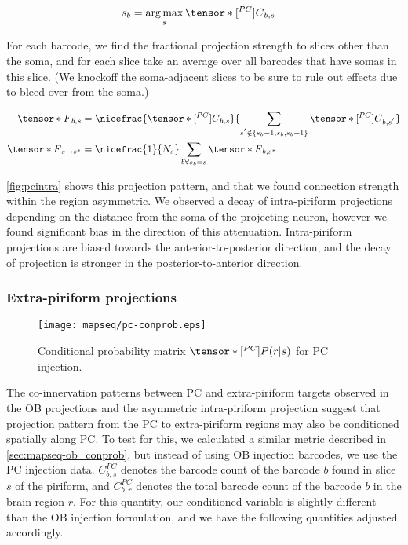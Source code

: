 \documentclass[../dissertation.tex]{subfiles}
\begin{document}
\begin{align}
    s_b & = \operatorname*{arg\,max}_s \tensor*[^{PC}]{C}{_{b, s}}
\end{align}

For each barcode, we find the fractional projection strength to slices other than the soma, and for each slice take an average over all barcodes that have somas in this slice. 
(We knockoff the soma-adjacent slices to be sure to rule out effects due to bleed-over from the soma.)

\begin{align}
    \tensor*{F}{_{b, s}} & = \nicefrac{
        \tensor*[^{PC}]{C}{_{b, s}} }{
        \sum_{ s^{'} \notin \left\{ s_{b} - 1, s_{b}, s_{b} + 1 \right\} }
        \tensor*[^{PC}]{C}{_{b, s^{'}}} } \\
    \tensor*{F}{_{s \rightarrow s^{*} }} & =
        \nicefrac{1}{N_s}
        \sum_{b \forall s_{b} = s} \tensor*{F}{_{b, s^{*} }}
\end{align}

\cref{fig:pcintra} shows this projection pattern, and that we found connection strength within the region asymmetric.
We observed a decay of intra-piriform projections depending on the distance from the soma of the projecting neuron, however we found significant bias in the direction of this attenuation.
Intra-piriform projections are biased towards the anterior-to-posterior direction, and the decay of projection is stronger in the posterior-to-anterior direction.

\subsubsection{Extra-piriform projections}

\begin{figure}[h!]
    \centering
    \texttt{[image: mapseq/pc-conprob.eps]}
    \caption{Conditional probability matrix $\tensor*[^{PC}]{P}{} (r | s)$ for PC injection.}
    \label{fig:pcconprob}
\end{figure}

The co-innervation patterns between PC and extra-piriform targets observed in the OB projections and the asymmetric intra-piriform projection suggest that projection pattern from the PC to extra-piriform regions may also be conditioned spatially along PC.
To test for this, we calculated a similar metric described in \cref{sec:mapseq-ob_conprob}, but instead of using OB injection barcodes, we use the PC injection data.
$C^{PC}_{b,s}$ denotes the barcode count of the barcode $b$ found in slice $s$ of the piriform, and $C^{PC}_{b,r}$ denotes the total barcode count of the barcode $b$ in the brain region $r$.
For this quantity, our conditioned variable is slightly different than the OB injection formulation, and we have the following quantities adjusted accordingly.
\end{document}
